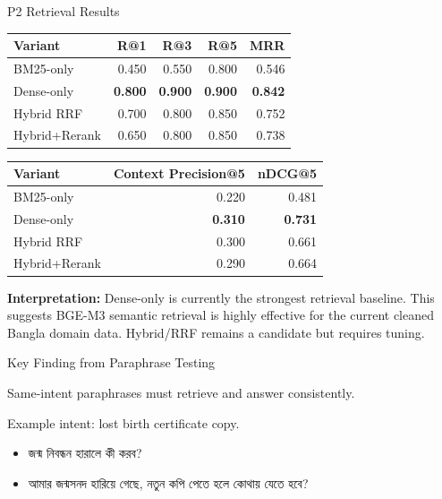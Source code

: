 \documentclass[final]{beamer}
\newlength{\colwidth}
\newcommand{\bn}[1]{{\bengalifont #1}}
\begin{document}
\begin{frame}[t]
\begin{columns}[t]
\begin{column}{\colwidth}
\begin{block}{P2 Retrieval Results}
    \begin{table}
      \centering
      \small
      \begin{tabular}{lrrrr}
        \toprule
        \textbf{Variant} & \textbf{R@1} & \textbf{R@3} & \textbf{R@5} & \textbf{MRR} \\
        \midrule
        BM25-only & 0.450 & 0.550 & 0.800 & 0.546 \\
        Dense-only & \textbf{0.800} & \textbf{0.900} & \textbf{0.900} & \textbf{0.842} \\
        Hybrid RRF & 0.700 & 0.800 & 0.850 & 0.752 \\
        Hybrid+Rerank & 0.650 & 0.800 & 0.850 & 0.738 \\
        \bottomrule
      \end{tabular}
    \end{table}

    \begin{table}
      \centering
      \small
      \begin{tabular}{lrr}
        \toprule
        \textbf{Variant} & \textbf{Context Precision@5} & \textbf{nDCG@5} \\
        \midrule
        BM25-only & 0.220 & 0.481 \\
        Dense-only & \textbf{0.310} & \textbf{0.731} \\
        Hybrid RRF & 0.300 & 0.661 \\
        Hybrid+Rerank & 0.290 & 0.664 \\
        \bottomrule
      \end{tabular}
    \end{table}

    \textbf{Interpretation:} Dense-only is currently the strongest retrieval
    baseline. This suggests BGE-M3 semantic retrieval is highly effective for
    the current cleaned Bangla domain data. Hybrid/RRF remains a candidate but
    requires tuning.

  \end{block}

  \begin{alertblock}{Key Finding from Paraphrase Testing}

    Same-intent paraphrases must retrieve and answer consistently.

    \vspace{0.3em}
    Example intent: lost birth certificate copy.

    \begin{itemize}
      \item \bn{জন্ম নিবন্ধন হারালে কী করব?}
      \item \bn{আমার জন্মসনদ হারিয়ে গেছে, নতুন কপি পেতে হলে কোথায় যেতে হবে?}
    \end{itemize}


\end{alertblock}
\end{column}
\end{columns}
\end{frame}
\end{document}
